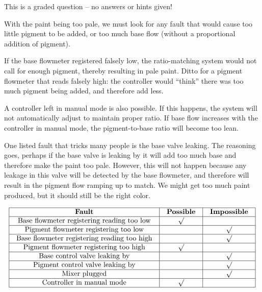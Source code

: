 \vfil 

\eject






This is a graded question -- no answers or hints given!







With the paint being too pale, we must look for any fault that would cause too little pigment to be added, or too much base flow (without a proportional addition of pigment).

\vskip 10pt

If the base flowmeter registered falsely low, the ratio-matching system would not call for enough pigment, thereby resulting in pale paint.  Ditto for a pigment flowmeter that reads falsely high: the controller would ``think'' there was too much pigment being added, and therefore add less.

\vskip 10pt

A controller left in manual mode is also possible.  If this happens, the system will not automatically adjust to maintain proper ratio.  If base flow increases with the controller in manual mode, the pigment-to-base ratio will become too lean.

\vskip 10pt

One listed fault that tricks many people is the base valve leaking.  The reasoning goes, perhaps if the base valve is leaking by it will add too much base and therefore make the paint too pale.  However, this will not happen because any leakage in this valve will be detected by the base flowmeter, and therefore will result in the pigment flow ramping up to match.  We might get too much paint produced, but it should still be the right color.




$$\vbox{\offinterlineskip
\halign{\strut
\vrule \quad\hfil # \ \hfil & 
\vrule \quad\hfil # \ \hfil & 
\vrule \quad\hfil # \ \hfil \vrule \cr
\noalign{\hrule}
%
{\bf Fault} & {\bf Possible} & {\bf Impossible} \cr
%
\noalign{\hrule}
%
Base flowmeter registering reading too low & $\surd$ &  \cr
%
\noalign{\hrule}
%
Pigment flowmeter registering too low &  & $\surd$ \cr
%
\noalign{\hrule}
%
Base flowmeter registering reading too high &  & $\surd$ \cr
%
\noalign{\hrule}
%
Pigment flowmeter registering too high & $\surd$ &  \cr
%
\noalign{\hrule}
%
Base control valve leaking by &  & $\surd$ \cr
%
\noalign{\hrule}
%
Pigment control valve leaking by &  & $\surd$ \cr
%
\noalign{\hrule}
%
Mixer plugged &  & $\surd$ \cr
%
\noalign{\hrule}
%
Controller in manual mode & $\surd$ &  \cr
%
\noalign{\hrule}
} %
}$$ %





